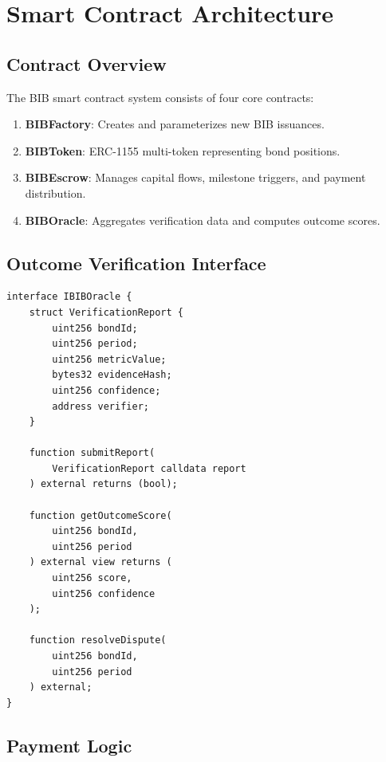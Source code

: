 \section{Smart Contract Architecture}

\label{sec:contracts}

\subsection{Contract Overview}

The BIB smart contract system consists of four core contracts:

\begin{enumerate}
  \item \textbf{BIBFactory}: Creates and parameterizes new BIB issuances.
  \item \textbf{BIBToken}: ERC-1155 multi-token representing bond
    positions.
  \item \textbf{BIBEscrow}: Manages capital flows, milestone triggers,
    and payment distribution.
  \item \textbf{BIBOracle}: Aggregates verification data and computes
    outcome scores.
\end{enumerate}

\subsection{Outcome Verification Interface}

\begin{lstlisting}[caption={Oracle verification interface.},
  label={lst:oracle}]
interface IBIBOracle {
    struct VerificationReport {
        uint256 bondId;
        uint256 period;
        uint256 metricValue;
        bytes32 evidenceHash;
        uint256 confidence;
        address verifier;
    }

    function submitReport(
        VerificationReport calldata report
    ) external returns (bool);

    function getOutcomeScore(
        uint256 bondId,
        uint256 period
    ) external view returns (
        uint256 score,
        uint256 confidence
    );

    function resolveDispute(
        uint256 bondId,
        uint256 period
    ) external;
}
\end{lstlisting}

\subsection{Payment Logic}

